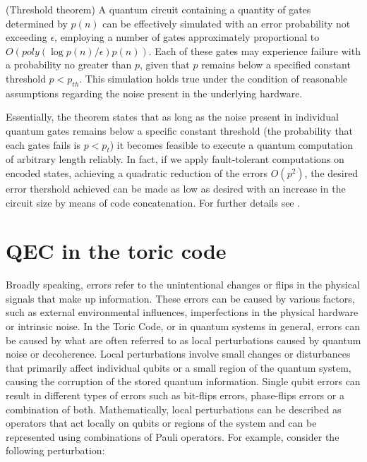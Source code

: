 \documentclass{Configuration_Files/PoliMi3i_thesis}
\begin{document}
\begin{theorem}(Threshold theorem)
	A quantum circuit containing a quantity of gates determined by $p(n)$ can be effectively simulated with an error probability not exceeding $\epsilon$, employing a number of gates approximately proportional to $O(poly(\log p(n)/\epsilon)p(n))$. Each of these gates may experience failure with a probability no greater than $p$, given that $p$ remains below a specified constant threshold $p < p_{th}$. This simulation holds true under the condition of reasonable assumptions regarding the noise present in the underlying hardware.
\end{theorem}

Essentially, the theorem states that as long as the noise present in individual quantum gates remains below a specific constant threshold (the probability that each gates fails is $p<p_t$) it becomes feasible to execute a quantum computation of arbitrary length reliably. In fact, if we apply fault-tolerant computations on encoded states, achieving a quadratic reduction of the errors $O(p^2)$, the desired error thershold achieved can be made as low as desired with an increase in the circuit size by means of code concatenation. For further details see \cite{Nie06}.\newline














\newpage
\section{QEC in the toric code}
\label{sec:TC}

Broadly speaking, errors refer to the unintentional changes or flips in the physical signals that make up information. These errors can be caused by various factors, such as external environmental influences, imperfections in the physical hardware or intrinsic noise. 
In the Toric Code, or in quantum systems in general, errors can be caused by what are often referred to as local perturbations caused by quantum noise or decoherence. Local perturbations involve small changes or disturbances that primarily affect individual qubits or a small region of the quantum system, causing the corruption of the stored quantum information. Single qubit errors can result in different types of errors such as bit-flips errors, phase-flips errors or a combination of both. \newline
Mathematically, local perturbations can be described as operators that act locally on qubits or regions of the system and can be represented using combinations of Pauli operators. For example, consider the following perturbation:
\end{document}
